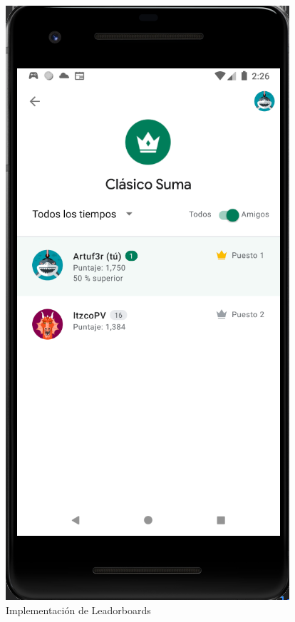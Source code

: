 \documentclass{article}
\begin{document}
\begin{figure}[H]
    \centering
    \includegraphics[scale=0.8]{imgs/Imp/Leaderboards}
    \caption{Implementación de Leadorboards}
\end{figure}
\end{document}
